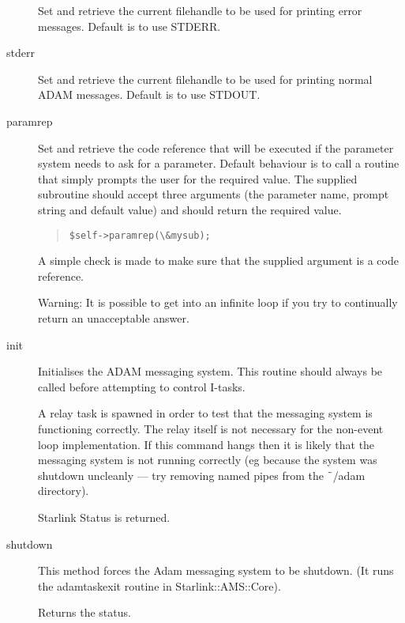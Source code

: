 \documentclass[twoside,11pt]{article}
\newenvironment{myquote}{\begin{quote}\begin{small}}{\end{small}\end{quote}}
\renewcommand{\_}{\texttt{\symbol{95}}}
\begin{document}
\begin{description}
Set and retrieve the current filehandle to be used for printing
error messages. Default is to use STDERR.

\item[stderr] \mbox{}

Set and retrieve the current filehandle to be used for printing
normal ADAM messages. Default is to use STDOUT.

\item[paramrep] \mbox{}

Set and retrieve the code reference that will be executed if
the parameter system needs to ask for a parameter.
Default behaviour is to call a routine that simply prompts
the user for the required value. The supplied subroutine
should accept three arguments (the parameter name, prompt string and
default value) and should return the required value.
\begin{myquote}
\begin{verbatim}
$self->paramrep(\&mysub);
\end{verbatim} 
\end{myquote} %

A simple check is made to make sure that the supplied argument
is a code reference.

Warning: It is possible to get into an infinite loop if you try
to continually return an unacceptable answer.

\item[init] \mbox{}

Initialises the ADAM messaging system. This routine should always be
called before attempting to control I-tasks.

A relay task is spawned in order to test that the messaging system
is functioning correctly. The relay itself is not necessary for the
non-event loop implementation. If this command hangs then it is
likely that the messaging system is not running correctly (eg
because the system was shutdown uncleanly --- try removing named pipes
from the $\tilde{\hspace{0.4em}}$/adam directory).

Starlink Status is returned.

\item[shutdown] \mbox{}

This method forces the Adam messaging system to be shutdown.
(It runs the adamtask\_exit routine in Starlink::AMS::Core).

Returns the status.

\end{description}
\end{document}
